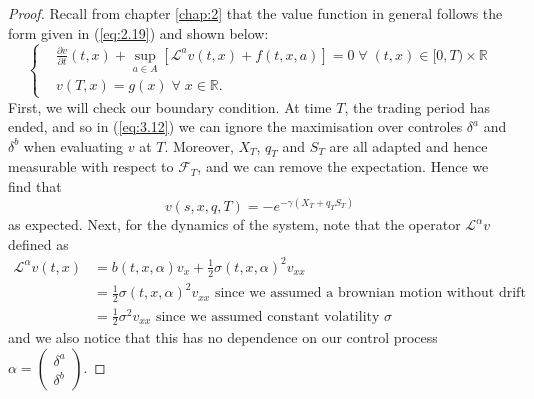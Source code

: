 \begin{proof}
    Recall from chapter \ref{chap:2} that the value function in general follows the 
    form given in (\ref{eq:2.19}) and shown below:
    \begin{equation*}
        \left\{
        \begin{aligned}
            &\frac{\partial v}{\partial t}(t,x)+\sup_{a\in A}\left[\mathcal{L}^av(t,x)+f(t,x,a)\right]=0\;\forall\;(t,x)\in[0,T)\times\mathbb{R}\\
            &v(T,x)=g(x)\;\forall\;x\in\mathbb{R}.
        \end{aligned}
        \right.
    \end{equation*}
    First, we will check our boundary condition. At time $T$, the trading period 
    has ended, and so in (\ref{eq:3.12}) we can ignore the maximisation over 
    controles $\delta^a$ and $\delta^b$ when evaluating $v$ at $T$. Moreover,
    $X_T$, $q_T$ and $S_T$ are all adapted and hence measurable with respect to 
    $\mathcal{F}_T$, and we can remove the expectation. Hence we find that 
    \begin{equation}
        v(s,x,q,T)=-e^{-\gamma(X_T+q_TS_T)}
    \end{equation}
    as expected. Next, for the dynamics of the system, note that the operator 
    $\mathcal{L}^\alpha v$ defined as 
    \begin{align*}
        \mathcal{L}^\alpha v(t,x)&=b(t,x,\alpha)v_x+\frac{1}{2}\sigma(t,x,\alpha)^2v_{xx}\\
        &=\frac{1}{2}\sigma(t,x,\alpha)^2v_{xx}\textrm{ since we assumed a brownian motion without drift}\\
        &=\frac{1}{2}\sigma^2v_{xx}\textrm{ since we assumed constant volatility $\sigma$}
    \end{align*}
    and we also notice that this has no dependence on our control process 
    $\alpha=\begin{pmatrix}\delta^{a}\\\delta^{b}\end{pmatrix}$.


\end{proof}

